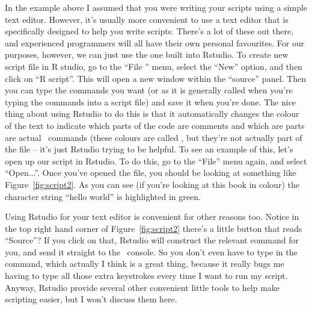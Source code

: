 In the example above I assumed that you were writing your scripts using a simple text editor. However, it's usually more convenient to use a text editor that is specifically designed to help you write scripts. There's a lot of these out there, and experienced programmers will all have their own personal favourites. For our purposes, however, we can just use the one built into Rstudio. To create new script file in R studio, go to the ``File '' menu, select the ``New'' option, and then click on ``R script''. This will open a new window within the ``source'' panel. Then you can type the commands you want (or  as it is generally called when you're typing the commands into a script file) and save it when you're done. The nice thing about using Rstudio to do this is that it automatically changes the colour of the text to indicate which parts of the code are comments and which are parts are actual \R\ commands (these colours are called , but they're not actually part of the file -- it's just Rstudio trying to be helpful. To see an example of this, let's open up our  script in Rstudio. To do this, go to the ``File'' menu again, and select ``Open...''. Once you've opened the file, you should be looking at something like Figure~\ref{fig:script2}. As you can see (if you're looking at this book in colour) the character string ``hello world'' is highlighted in green.

Using Rstudio for your text editor is convenient for other reasons too. Notice in the top right hand corner of Figure~\ref{fig:script2} there's a little button that reads ``Source''? If you click on that, Rstudio will construct the relevant  command for you, and send it straight to the \R\ console. So you don't even have to type in the  command, which actually I think is a great thing, because it really bugs me having to type all those extra keystrokes every time I want to run my script. Anyway, Rstudio provide several other convenient little tools to help make scripting easier, but I won't discuss them here.


